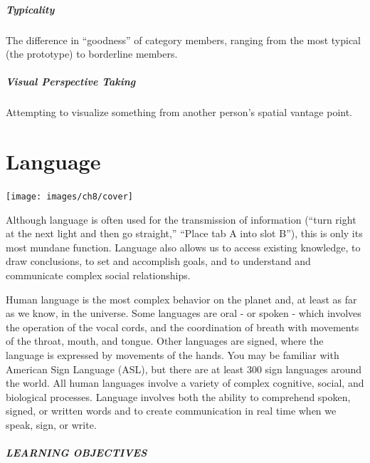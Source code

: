 \documentclass[
]{krantz}
\begin{document}
\paragraph*{Typicality}\label{typicality-1}

The difference in ``goodness'' of category members, ranging from the most typical (the prototype) to borderline members.

\paragraph*{Visual Perspective Taking}\label{visual-perspective-taking}

Attempting to visualize something from another person's spatial vantage point.

\chapter{Language}\label{language}

\begin{center}\texttt{[image: images/ch8/cover]} \end{center}

Although language is often used for the transmission of information (``turn right at the next light and then go straight,'' ``Place tab A into slot B''), this is only its most mundane function. Language also allows us to access existing knowledge, to draw conclusions, to set and accomplish goals, and to understand and communicate complex social relationships.

Human language is the most complex behavior on the planet and, at least as far as we know, in the universe. Some languages are oral - or spoken - which involves the operation of the vocal cords, and the coordination of breath with movements of the throat, mouth, and tongue. Other languages are signed, where the language is expressed by movements of the hands. You may be familiar with American Sign Language (ASL), but there are at least 300 sign languages around the world. All human languages involve a variety of complex cognitive, social, and biological processes. Language involves both the ability to comprehend spoken, signed, or written words and to create communication in real time when we speak, sign, or write.

\paragraph*{LEARNING OBJECTIVES}\label{learning-objectives-7}
\end{document}

